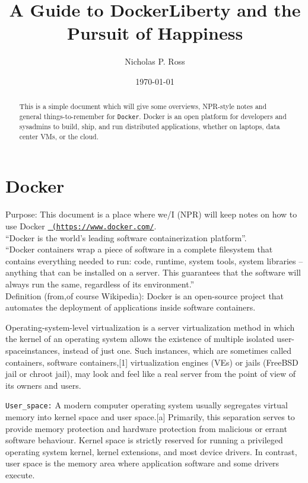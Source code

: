 \documentclass[11pt]{article}
\begin{document}
\title{A Guide to DockerLiberty and the Pursuit of Happiness}
\author{Nicholas P. Ross}
\date{\today}
\maketitle


\begin{abstract}
This is a simple document which will give some overviews, NPR-style
notes and general things-to-remember for {\tt Docker}. Docker is an
open platform for developers and sysadmins to build, ship, and run
distributed applications, whether on laptops, data center VMs, or the
cloud.
\end{abstract}


\section{Docker}

Purpose: This document is a place where we/I (NPR) will keep notes on
how to use Docker \href{https://www.docker.com/}{\tt
(https://www.docker.com/}.\\

\noindent
``Docker is the world's leading software containerization platform''.\\

\noindent
``Docker containers wrap a piece of software in a complete filesystem that contains everything needed to run: code, runtime, system tools, system libraries – anything that can be installed on a server. This guarantees that the software will always run the same, regardless of its environment.''\\


Definition (from,of course Wikipedia): 
Docker is an open-source project that automates the deployment of applications inside software containers.  

Operating-system-level virtualization is a server virtualization method in which the kernel of an operating system allows the existence of multiple isolated user-spaceinstances, instead of just one. Such instances, which are sometimes called containers, software containers,[1] virtualization engines (VEs) or jails (FreeBSD jail or chroot jail), may look and feel like a real server from the point of view of its owners and users.

{\tt User\_space:} A modern computer operating system usually segregates virtual memory into kernel space and user space.[a] Primarily, this separation serves to provide memory protection and hardware protection from malicious or errant software behaviour.
Kernel space is strictly reserved for running a privileged operating system kernel, kernel extensions, and most device drivers. In contrast, user space is the memory area where application software and some drivers execute.
\end{document}
